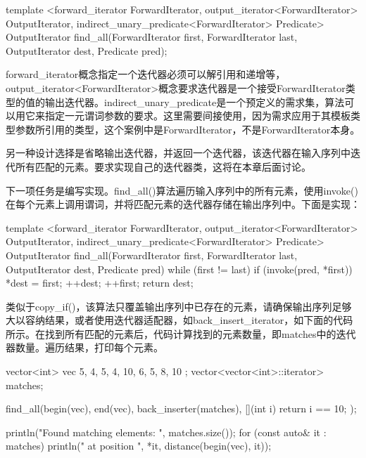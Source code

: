 \begin{cpp}
template <forward_iterator ForwardIterator,
          output_iterator<ForwardIterator> OutputIterator,
          indirect_unary_predicate<ForwardIterator> Predicate>
OutputIterator find_all(ForwardIterator first, ForwardIterator last,
                        OutputIterator dest, Predicate pred);
\end{cpp}

forward\_iterator概念指定一个迭代器必须可以解引用和递增等，output\_iterator<ForwardIterator>概念要求迭代器是一个接受ForwardIterator类型的值的输出迭代器。indirect\_unary\_predicate是一个预定义的需求集，算法可以用它来指定一元谓词参数的要求。这里需要间接使用，因为需求应用于其模板类型参数所引用的类型，这个案例中是ForwardIterator，不是ForwardIterator本身。

另一种设计选择是省略输出迭代器，并返回一个迭代器，该迭代器在输入序列中迭代所有匹配的元素。要求实现自己的迭代器类，这将在本章后面讨论。

下一项任务是编写实现。find\_all()算法遍历输入序列中的所有元素，使用invoke()在每个元素上调用谓词，并将匹配元素的迭代器存储在输出序列中。下面是实现：

\begin{cpp}
template <forward_iterator ForwardIterator,
          output_iterator<ForwardIterator> OutputIterator,
          indirect_unary_predicate<ForwardIterator> Predicate>
OutputIterator find_all(ForwardIterator first, ForwardIterator last,
                        OutputIterator dest, Predicate pred)
{
    while (first != last) {
        if (invoke(pred, *first)) {
            *dest = first;
            ++dest;
        }
        ++first;
    }
    return dest;
}
\end{cpp}

类似于copy\_if()，该算法只覆盖输出序列中已存在的元素，请确保输出序列足够大以容纳结果，或者使用迭代器适配器，如back\_insert\_iterator，如下面的代码所示。在找到所有匹配的元素后，代码计算找到的元素数量，即matches中的迭代器数量。遍历结果，打印每个元素。

\begin{cpp}
vector<int> vec { 5, 4, 5, 4, 10, 6, 5, 8, 10 };
vector<vector<int>::iterator> matches;

find_all(begin(vec), end(vec), back_inserter(matches),
    [](int i){ return i == 10; });

println("Found {} matching elements: ", matches.size());
for (const auto& it : matches) {
    println("{} at position {}", *it, distance(begin(vec), it));
}
\end{cpp}

